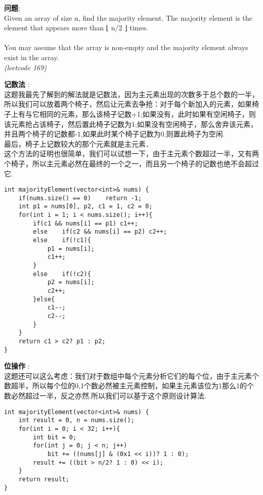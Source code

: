     
\begin{description}
    \item{\textbf{问题}}:\\
Given an array of size n, find the majority element. The majority element is the element that appears more than ⌊ n/2 ⌋ times.\\
\\
You may assume that the array is non-empty and the majority element always exist in the array.\\
\textit{(leetcode 169)}
    \item{\textbf{记数法}} : 
    \\这题我最先了解到的解法就是记数法，因为主元素出现的次数多于总个数的一半，所以我们可以放着两个椅子，然后让元素去争抢：对于每个新加入的元素，如果椅子上有与它相同的元素，那么该椅子记数+1;如果没有，此时如果有空闲椅子，则该元素抢占该椅子，然后置此椅子记数为1;如果没有空闲椅子，那么舍弃该元素，并且两个椅子的记数都-1,如果此时某个椅子记数为0,则置此椅子为空闲.
	\\最后，椅子上记数较大的那个元素就是主元素．
	\\这个方法的证明也很简单，我们可以试想一下，由于主元素个数超过一半，又有两个椅子，所以主元素必然在最终的一个之一，而且另一个椅子的记数也绝不会超过它.
    \begin{lstlisting}
int majorityElement(vector<int>& nums) {
	if(nums.size() == 0)	return -1;
	int p1 = nums[0], p2, c1 = 1, c2 = 0;
	for(int i = 1; i < nums.size(); i++){
		if(c1 && nums[i] == p1)	c1++;
		else	if(c2 && nums[i] == p2)	c2++;
		else	if(!c1){
			p1 = nums[i];
			c1++;
		}
		else	if(!c2){
			p2 = nums[i];
			c2++;
		}else{
			c1--;
			c2--;
		}
	}
	return c1 > c2? p1 : p2;
}
    \end{lstlisting}
    \item{\textbf{位操作}} : 
	\\这题还可以这么考虑：我们对于数组中每个元素分析它们的每个位，由于主元素个数超半，所以每个位的0,1个数必然被主元素控制，如果主元素该位为1那么1的个数必然超过一半，反之亦然.所以我们可以基于这个原则设计算法.
	\begin{lstlisting}
int majorityElement(vector<int>& nums) {
	int result = 0, n = nums.size();
	for(int i = 0; i < 32; i++){
		int bit = 0;
		for(int j = 0; j < n; j++)
			bit += ((nums[j] & (0x1 << i))? 1 : 0);
		result += ((bit > n/2? 1 : 0) << i);
	}
	return result;
}
	\end{lstlisting}
\end{description}
